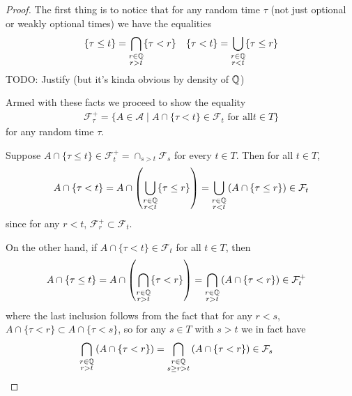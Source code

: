 \begin{proof}
The first thing is to notice that for any random time $\tau$ (not just
optional or weakly optional times) we have the equalities
\begin{align*}
&\lbrace \tau \leq t \rbrace = \bigcap_{\substack{
r \in \mathbb{Q} \\
r >  t}} 
\lbrace \tau < r \rbrace
&\lbrace \tau < t \rbrace = \bigcup_{\substack{
r \in \mathbb{Q} \\ 
r < t}} 
\lbrace \tau \leq r \rbrace
\end{align*}
TODO: Justify (but it's kinda obvious by density of $\mathbb{Q}$)

Armed with these facts we proceed to show the equality 
\begin{align*}
\mathcal{F}^+_{\tau} = \lbrace A \in \mathcal{A}
\mid A \cap \lbrace \tau < t \rbrace \in \mathcal{F}_t \text { for all
} t \in T \rbrace
\end{align*} 
for any random time $\tau$.

Suppose $A \cap \lbrace \tau \leq t \rbrace \in \mathcal{F}^+_t =
\cap_{s>t} \mathcal{F}_s$ for every $t \in T$.  Then for all $t  \in T$,
\begin{align*}
A \cap \lbrace \tau < t \rbrace &= A \cap \left (\bigcup_{\substack{r \in \mathbb{Q} \\ r <
  t}} \lbrace \tau \leq r \rbrace \right ) =\bigcup_{\substack{r \in \mathbb{Q} \\ r <
  t}}  \left ( A \cap \lbrace \tau \leq r \rbrace \right ) \in \mathcal{F}_t\\
\end{align*}
since for any $r < t$, $\mathcal{F}^+_r \subset \mathcal{F}_t$.

On the other hand, if $A \cap \lbrace \tau < t \rbrace \in
\mathcal{F}_t$ for all $t \in T$, then
\begin{align*}
A \cap \lbrace \tau \leq t \rbrace &= A \cap \left ( \bigcap_{\substack{r \in \mathbb{Q} \\ r >
  t}} \lbrace \tau < r \rbrace \right ) =  \bigcap_{\substack{r \in \mathbb{Q} \\ r >
  t}} \left ( A \cap  \lbrace \tau < r \rbrace \right ) \in \mathcal{F}^+_t
\end{align*}
where the last inclusion follows from the fact that for any $r < s$, $ A \cap
\lbrace \tau < r \rbrace \subset  A \cap  \lbrace \tau < s
\rbrace$, so for any $s \in T$ with $s > t$ we in fact
have
\begin{align*}
\bigcap_{\substack{r \in \mathbb{Q} \\ r >
  t}} \left ( A \cap  \lbrace \tau < r \rbrace \right ) &= 
\bigcap_{\substack{r \in  \mathbb{Q} \\ 
s \geq r >  t}} \left ( A \cap  \lbrace \tau < r \rbrace \right ) \in \mathcal{F}_s
\end{align*}


\end{proof}
